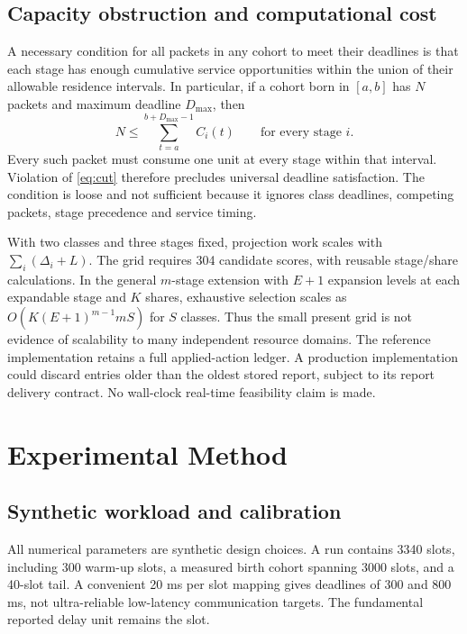 \documentclass[10pt,a4paper]{article}
\begin{document}
\subsection{Capacity obstruction and computational cost}
A necessary condition for all packets in any cohort to meet their deadlines
is that each stage has enough cumulative service opportunities within the
union of their allowable residence intervals. In particular, if a cohort born
in $[a,b]$ has $N$ packets and maximum deadline $D_{\max}$, then
\begin{equation}
 N\le\sum_{t=a}^{b+D_{\max}-1} C_i(t)\qquad\text{for every stage }i.\label{eq:cut}
\end{equation}
Every such packet must consume one unit at every stage within that interval.
Violation of \eqref{eq:cut} therefore precludes universal deadline satisfaction.
The condition is loose and not sufficient because it ignores class deadlines,
competing packets, stage precedence and service timing.

With two classes and three stages fixed, projection work scales with
$\sum_i(\Delta_i+L)$. The grid requires 304 candidate scores, with reusable
stage/share calculations. In the general $m$-stage extension with $E+1$
expansion levels at each expandable stage and $K$ shares, exhaustive selection
scales as $O(K(E+1)^{m-1}mS)$ for $S$ classes. Thus the small present grid is
not evidence of scalability to many independent resource domains. The reference
implementation retains a full applied-action ledger. A production implementation
could discard entries older than the oldest stored report, subject to its report
delivery contract. No wall-clock real-time feasibility claim is made.

\section{Experimental Method}
\subsection{Synthetic workload and calibration}
All numerical parameters are synthetic design choices. A run contains 3340
slots, including 300 warm-up slots, a measured birth cohort spanning 3000 slots,
and a 40-slot tail. A convenient 20 ms per slot mapping gives deadlines of
300 and 800 ms, not ultra-reliable low-latency communication targets.
The fundamental reported delay unit remains the slot.
\end{document}
